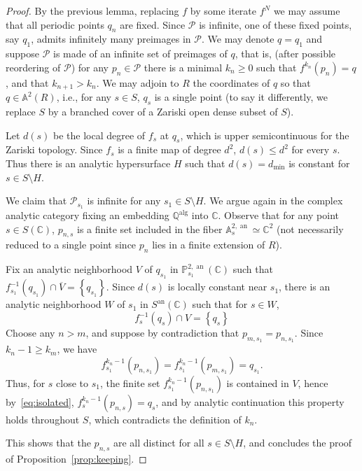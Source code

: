 \documentclass[11 pt, oneside, a4paper]{amsart}
\newcommand{\C}{\mathbb{C}}
\newcommand{\Q}{\mathbb{Q}}
\newcommand{\A}{\mathbb{A}}
\renewcommand{\P}{\mathbb{P}}
\newcommand{\set}[1]{{\left\{#1\right\}}}
\DeclareMathOperator{\an}{an}
\DeclareMathOperator{\alg}{alg}
\newcommand{\inv}{^{-1}}
\theoremstyle{definition}
\theoremstyle{definition}
\begin{document}
\begin{proof}
By  the previous lemma, 
replacing $f$ by some iterate 
$f^N$ we may assume that all periodic points $q_n$ are fixed.
Since $\mathcal P$ is infinite, one of these fixed points, say  $q_1$,
 admits   infinitely many preimages   in $\mathcal P$. 
 We may denote $q=q_1$ and suppose $\mathcal P$ is made of an infinite set of 
 preimages of $q$, that is, (after possible reordering of $\mathcal P$) for any $p_n\in \mathcal P$ there is a minimal 
 $k_n\geq 0$ such that $f^{k_n}(p_n) = q$, and that $k_{n+1}>k_n$.
We may adjoin to $R$ the coordinates of $q$ so that 
$q \in \A^2(R)$, i.e., for any  $s\in S$, $q_s$ is a single point
(to say it differently, we replace $S$ by a  branched cover of a Zariski open dense subset of $S$).
 
 Let $d(s)$ be the local degree of $f_s$ at $q_s$, which is 
 upper semicontinuous for the Zariski topology. 
 Since $f_s$ is a finite map of degree $d^2$, $d(s)\leq d^2$ for every $s$. 
Thus there is an analytic hypersurface $H$ such that $d(s)  = d_{\mathrm{min}}$ is constant for 
$s\in S\setminus H$. 


We claim that $\mathcal P_{s_1}$ is infinite
for any $s_1\in S\setminus H$. We argue again 
in the complex analytic category fixing an embedding
 $\Q^{\alg}$ into $\C$.  Observe that for any point $s\in S(\C)$,    $p_{n,s}$ is  
  a finite set included in the fiber $\A^{2,\an}_s\simeq \C^2$ (not necessarily reduced to a single point since 
   $p_n$ lies in a finite extension of $R$).

 Fix an analytic neighborhood $V$ 
of $q_{s_1}$ in $\P^{2,\an}_{s_1}(\C)$ such 
that $f_{s_1}\inv(q_{s_1})\cap \overline V = \set{q_{s_1}}$. 
Since $d(s)$ is locally constant near $s_1$, 
there is an analytic neighborhood $W$ of $s_1$ in $S^{\an}(\C)$ such that 
for $s\in W$,   
\begin{equation}\label{eq:isolated}
f_{s}\inv(q_{s})\cap   V = \set{q_{s}}
\end{equation}
Choose any $n>m$, and suppose by contradiction that $p_{m, s_1} = p_{n, s_1}$. 
Since $k_n-1\geq k_m$, we have
$$ f^{k_n-1}_{s_1}(p_{n, s_1})= f^{k_n-1}_{s_1}(p_{m, s_1}) = q_{s_1}.$$ 
Thus, for $s$ close to $s_1$, the finite set  $f^{k_n-1}_{s_1}(p_{n, s_1})$ is contained in 
  $V$, hence by~\eqref{eq:isolated}, $f^{k_n-1}_{s}(p_{n, s}) =q_s$, and by analytic continuation this property holds throughout $S$, which contradicts the definition of $k_n$.  

This shows that the  $p_{n,s}$ are all distinct for all $s\in S\setminus H$, and
concludes the proof of Proposition~\ref{prop:keeping}. 
\end{proof}
\end{document}
